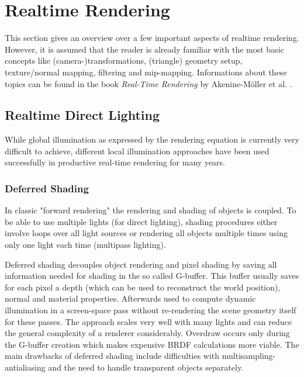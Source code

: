 \documentclass[thesis.tex]{subfiles}
\begin{document}
\section{Realtime Rendering}
This section gives an overview over a few important aspects of realtime rendering.
However, it is assumed that the reader is already familiar with the most basic concepts like (camera-)transformations, (triangle) geometry setup, texture/normal mapping, filtering and mip-mapping.
Informations about these topics can be found in the book \emph{Real-Time Rendering} by Akenine-M\"{o}ller et al. \cite{bib:RealtimeRenderingBook}. %

\subsection{Realtime Direct Lighting}
While global illumination as expressed by the rendering equation is currently very difficult to achieve, different local illumination approaches have been used successfully in productive real-time rendering for many years.

\subsubsection{Deferred Shading}
In classic "forward rendering" the rendering and shading of objects is coupled.
To be able to use multiple lights (for direct lighting), shading procedures either involve loops over all light sources or rendering all objects multiple times using only one light each time (multipass lighting).

Deferred shading decouples object rendering and pixel shading by saving all information needed for shading in the so called G-buffer. 
This buffer usually saves for each pixel a depth (which can be used to reconstruct the world position), normal and material properties.
Afterwards used to compute dynamic illumination in a screen-space pass without re-rendering the scene geometry itself for these passes.
The approach scales very well with many lights and can reduce the general complexity of a renderer considerably.
Overdraw occurs only during the G-buffer creation which makes expensive BRDF calculations more viable.
The main drawbacks of deferred shading include difficulties with multisampling-antialiasing and the need to handle transparent objects separately.
\end{document}
